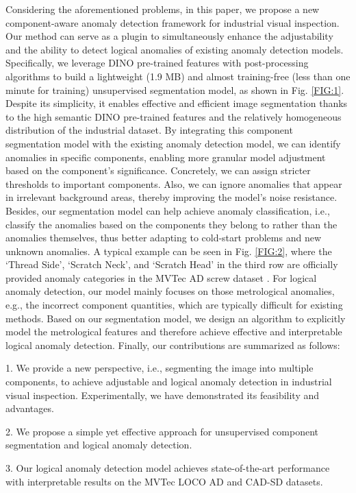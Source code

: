 \documentclass[final,5p,times,twocolumn]{elsarticle}
\begin{document}
Considering the aforementioned problems, in this paper, we propose a new component-aware anomaly detection framework for industrial visual inspection. Our method can serve as a plugin to simultaneously enhance the adjustability and the ability to detect logical anomalies of existing anomaly detection models. Specifically, we leverage DINO \cite{caron2021emerging} pre-trained features with post-processing algorithms to build a lightweight (1.9 MB) and almost training-free (less than one minute for training) unsupervised segmentation model, as shown in Fig. \ref{FIG:1}. Despite its simplicity, it enables effective and efficient image segmentation thanks to the high semantic DINO pre-trained features and the relatively homogeneous distribution of the industrial dataset. By integrating this component segmentation model with the existing anomaly detection model, we can identify anomalies in specific components, enabling more granular model adjustment based on the component's significance. Concretely, we can assign stricter thresholds to important components. Also, we can ignore anomalies that appear in irrelevant background areas, thereby improving the model's noise resistance. Besides, our segmentation model can help achieve anomaly classification, i.e., classify the anomalies based on the components they belong to rather than the anomalies themselves, thus better adapting to cold-start problems and new unknown anomalies. A typical example can be seen in Fig. \ref{FIG:2}, where the `Thread Side', `Scratch Neck', and `Scratch Head' in the third row are officially provided anomaly categories in the MVTec AD screw dataset \cite{bergmann2019mvtec}. For logical anomaly detection, our model mainly focuses on those metrological anomalies, e.g., the incorrect component quantities, which are typically difficult for existing methods. Based on our segmentation model, we design an algorithm to explicitly model the metrological features and therefore achieve effective and interpretable logical anomaly detection. Finally, our contributions are summarized as follows:

1. We provide a new perspective, i.e., segmenting the image into multiple components, to achieve adjustable and logical anomaly detection in industrial visual inspection. Experimentally, we have demonstrated its feasibility and advantages.

2. We propose a simple yet effective approach for unsupervised component segmentation and logical anomaly detection. 

3. Our logical anomaly detection model achieves state-of-the-art performance with interpretable results on the MVTec LOCO AD \cite{bergmann2022beyond} and CAD-SD \cite{ishida2023sa} datasets. 
\end{document}
